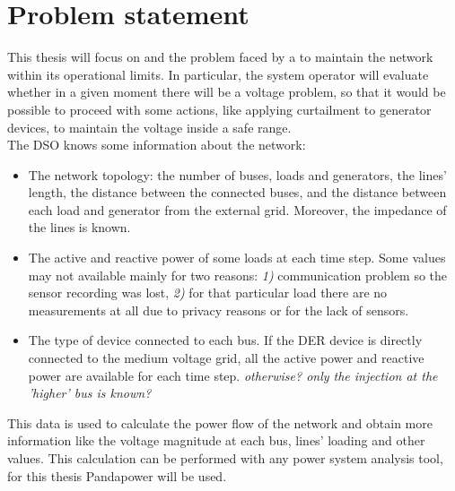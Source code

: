 \section{Problem statement}
\label{sec:ps}
This thesis will focus on  and the problem faced by a  to maintain the network within its operational limits. In particular, the system operator will evaluate whether in a given moment there will be a voltage problem, so that it would be possible to proceed with some actions, like applying curtailment to generator devices, to maintain the voltage inside a safe range.\\

The \gls{DSO} knows some information about the network:
\begin{itemize}
    \item The network topology: the number of buses, loads and generators, the lines' length, the distance between the connected buses, and the distance between each load and generator from the external grid. Moreover, the impedance of the lines is known.
    
    \item The active and reactive power of some loads at each time step. Some values may not available mainly for two reasons: \emph{1)} communication problem so the sensor recording was lost, \emph{2)} for that particular load there are no measurements at all due to privacy reasons or for the lack of sensors.
    
    \item The type of  device connected to each bus. If the \gls{DER} device is directly connected to the medium voltage grid, all the active power and reactive power are available for each time step. \emph{otherwise? only the injection at the 'higher' bus is known?}
\end{itemize}

This data is used to calculate the power flow of the network and obtain more information like the voltage magnitude at each bus, lines' loading and other values. This calculation can be performed with any power system analysis tool, for this thesis Pandapower will be used.\\


